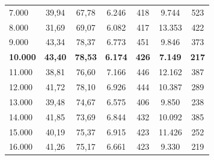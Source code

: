 \begin{table}[ht]
\begin{tabular}{lcccccc}
7.000               & 39,94                                                             & 67,78                                                           & 6.246              & 418               & 9.744              & 523              \\
8.000               & 31,69                                                             & 69,07                                                           & 6.082              & 417               & 13.353             & 422              \\
9.000               & 43,34                                                             & 78,37                                                           & 6.773              & 451               & 9.846              & 373              \\
\textbf{10.000}     & \textbf{43,40}                                                    & \textbf{78,53}                                                  & \textbf{6.174}     & \textbf{426}      & \textbf{7.149}     & \textbf{217}     \\
11.000              & 38,81                                                             & 76,60                                                           & 7.166              & 446               & 12.162             & 387              \\
12.000              & 41,72                                                             & 78,10                                                           & 6.926              & 444               & 10.387             & 289              \\
13.000              & 39,48                                                             & 74,67                                                           & 6.575              & 406               & 9.850              & 238              \\
14.000              & 41,85                                                             & 73,69                                                           & 6.844              & 432               & 10.092             & 385              \\
15.000              & 40,19                                                             & 75,37                                                           & 6.915              & 423               & 11.426             & 252              \\
16.000              & 41,26                                                             & 75,17                                                           & 6.661              & 423               & 9.330              & 219              \\

\end{tabular}
\end{table}
